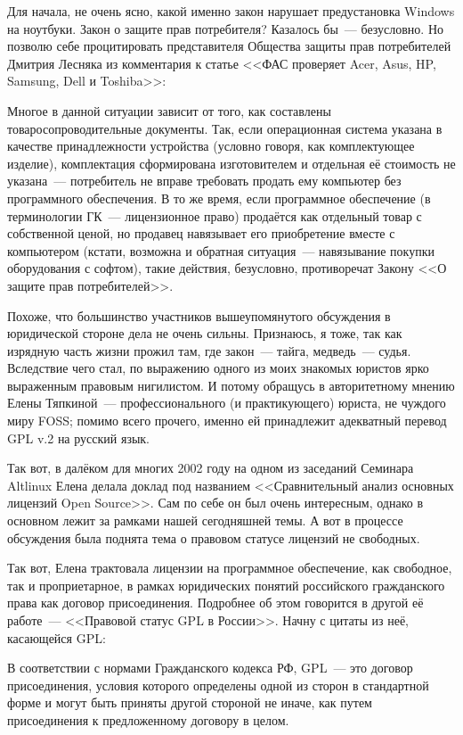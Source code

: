 Для начала, не очень ясно, какой именно закон нарушает предустановка Windows на ноутбуки. Закон о защите прав потребителя? Казалось бы~--- безусловно. Но позволю себе процитировать представителя Общества защиты прав потребителей Дмитрия Лесняка из комментария к статье <<ФАС проверяет Acer, Asus, HP, Samsung, Dell и Toshiba>>:


\begin{shadequote}{}
Многое в данной ситуации зависит от того, как составлены товаросопроводительные документы. Так, если операционная система указана в качестве принадлежности устройства (условно говоря, как комплектующее изделие), комплектация сформирована изготовителем и отдельная её стоимость не указана~--- потребитель не вправе требовать продать ему компьютер без программного обеспечения. В то же время, если программное обеспечение (в терминологии ГК~--- лицензионное право) продаётся как отдельный товар с собственной ценой, но продавец навязывает его приобретение вместе с компьютером (кстати, возможна и обратная ситуация~--- навязывание покупки оборудования с софтом), такие действия, безусловно, противоречат Закону <<О защите прав потребителей>>.
\end{shadequote}

Похоже, что большинство участников вышеупомянутого обсуждения в юридической стороне дела не очень сильны. Признаюсь, я тоже, так как изрядную часть жизни прожил там, где закон~--- тайга, медведь~--- судья. Вследствие чего стал, по выражению одного из моих знакомых юристов ярко выраженным правовым нигилистом. И потому обращусь в авторитетному мнению Елены Тяпкиной~--- профессионального (и практикующего) юриста, не чуждого миру FOSS; помимо всего прочего, именно ей принадлежит адекватный перевод GPL v.2 на русский язык.

Так вот, в далёком для многих 2002 году на одном из заседаний Семинара Altlinux Елена делала доклад под названием <<Сравнительный анализ основных лицензий Open Source>>. Сам по себе он был очень интересным, однако в основном лежит за рамками нашей сегодняшней темы. А вот в процессе обсуждения была поднята тема о правовом статусе лицензий не свободных.

Так вот, Елена трактовала лицензии на программное обеспечение, как свободное, так и проприетарное, в рамках юридических понятий российского гражданского права как договор присоединения. Подробнее об этом говорится в другой её работе~--- <<Правовой статус GPL в России>>. Начну с цитаты из неё, касающейся GPL:


\begin{shadequote}{}
В соответствии с нормами Гражданского кодекса РФ, GPL~--- это договор присоединения, условия которого определены одной из сторон в стандартной форме и могут быть приняты другой стороной не иначе, как путем присоединения к предложенному договору в целом.
\end{shadequote}

